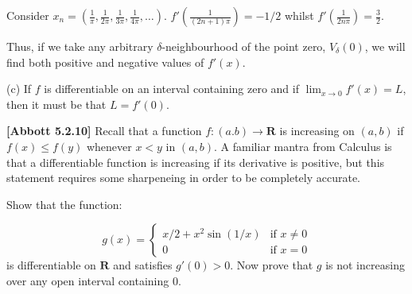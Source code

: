 \documentclass[10pt]{article}
\begin{document}

\begin{tikzpicture}[x=0.75pt,y=0.75pt,yscale=-1,xscale=1]





\end{tikzpicture}

Consider $\displaystyle x_{n} =\left(\frac{1}{\pi } ,\frac{1}{2\pi } ,\frac{1}{3\pi } ,\frac{1}{4\pi } ,\dotsc \right)$. $\displaystyle f'\left(\frac{1}{( 2n+1) \pi }\right) =-1/2$ whilst $\displaystyle f'\left(\frac{1}{2n\pi }\right) =\frac{3}{2}$. 

Thus, if we take any arbitrary $\displaystyle \delta $-neighbourhood of the point zero, $\displaystyle V_{\delta }( 0)$, we will find both positive and negative values of $\displaystyle f'( x)$.



(c) If $\displaystyle f$ is differentiable on an interval containing zero and if $\displaystyle \lim _{x\rightarrow 0} f'( x) =L$, then it must be that $\displaystyle L=f'( 0)$. 



\textbf{[Abbott 5.2.10] }Recall that a function $\displaystyle f:( a.b)\rightarrow \mathbf{R}$ is increasing on $\displaystyle ( a,b)$ if $\displaystyle f( x) \leq f( y)$ whenever $\displaystyle x< y$ in $\displaystyle ( a,b)$. A familiar mantra from Calculus is that a differentiable function is increasing if its derivative is positive, but this statement requires some sharpeneing in order to be completely accurate.



Show that the function:


\begin{equation*}
g( x) =\begin{cases}
x/2+x^{2}\sin( 1/x) & \text{if } x\neq 0\\
0 & \text{if } x=0
\end{cases}
\end{equation*}
is differentiable on $\displaystyle \mathbf{R}$ and satisfies $\displaystyle g'( 0)  >0$. Now prove that $\displaystyle g$ is not increasing over any open interval containing $\displaystyle 0$.
\end{document}
